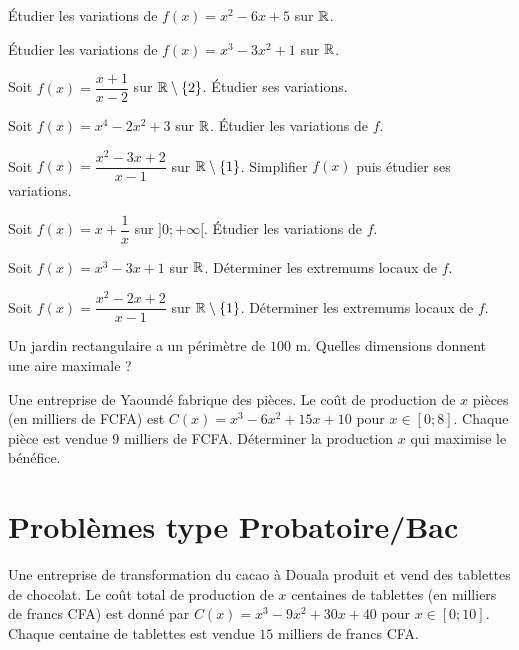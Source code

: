 \exo{}
Étudier les variations de $f(x)=x^2-6x+5$ sur $\mathbb{R}$.

\exo{}
Étudier les variations de $f(x)=x^3-3x^2+1$ sur $\mathbb{R}$.

\exo{}
Soit $f(x)=\dfrac{x+1}{x-2}$ sur $\mathbb{R}\setminus\{2\}$. Étudier ses variations.

\exo{}
Soit $f(x)=x^4-2x^2+3$ sur $\mathbb{R}$. Étudier les variations de $f$.

\exo{}
Soit $f(x)=\dfrac{x^2-3x+2}{x-1}$ sur $\mathbb{R}\setminus\{1\}$. Simplifier $f(x)$ puis étudier ses variations.

\exo{}
Soit $f(x)=x+\dfrac{1}{x}$ sur $]0;+\infty[$. Étudier les variations de $f$.


\exo{}
Soit $f(x)=x^3-3x+1$ sur $\mathbb{R}$. Déterminer les extremums locaux de $f$.

\exo{}
Soit $f(x)=\dfrac{x^2-2x+2}{x-1}$ sur $\mathbb{R}\setminus\{1\}$. Déterminer les extremums locaux de $f$.

\exo{}
Un jardin rectangulaire a un périmètre de $100$ m. Quelles dimensions donnent une aire maximale ?

\exo{}
Une entreprise de Yaoundé fabrique des pièces. Le coût de production de $x$ pièces (en milliers de FCFA) est $C(x)=x^3-6x^2+15x+10$ pour $x\in[0;8]$. Chaque pièce est vendue $9$ milliers de FCFA. Déterminer la production $x$ qui maximise le bénéfice.

\section{Problèmes type Probatoire/Bac}

Une entreprise de transformation du cacao à Douala produit et vend des tablettes de chocolat. Le coût total de production de $x$ centaines de tablettes (en milliers de francs CFA) est donné par $C(x)=x^3-9x^2+30x+40$ pour $x\in[0;10]$. Chaque centaine de tablettes est vendue $15$ milliers de francs CFA.

